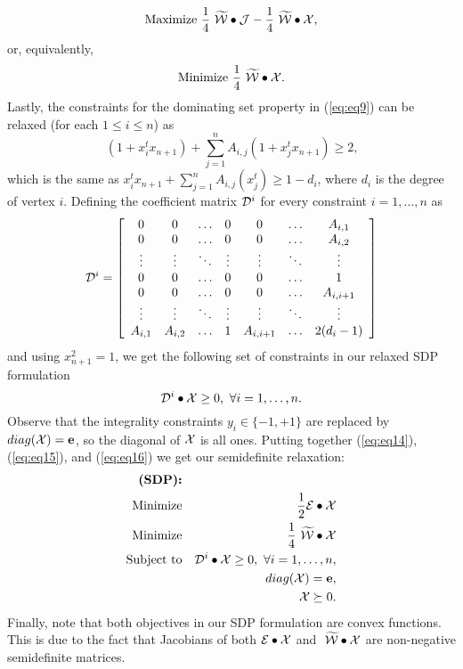 \documentclass{ieee}
\def\D{{\cal D}}
\def\E{{\cal E}}
\def\J{{\cal J}}
\def\W{{\cal W}}
\def\X{{\cal X}}
\def\e{{\bf e}}
\begin{document}
\[{\rm Maximize}\ \frac{1}{4}~\widetilde{\W} \bullet \J - \frac{1}{4}~\widetilde{\W} \bullet\X,\]
or, equivalently,
\begin{equation}
\label{eq:eq15}
{\rm Minimize }\ \frac{1}{4}~\widetilde{\W} \bullet\X.
\end{equation}
Lastly, the constraints for the dominating set property in (\ref{eq:eq9})
can be relaxed (for each $1\le i\le n$) as
\[ (1+x_i^tx_{n+1})+\sum_{j=1}^n A_{i,j}(1+x_j^tx_{n+1})\ge 2\mbox{,}\]
which is the same as
$x_i^tx_{n+1}+\sum_{j=1}^n A_{i,j}(x_j^t)\ge 1-d_i$,
where $d_i$ is the degree of vertex $i$. Defining the coefficient matrix 
$\D^i $ for every constraint $i=1,\ldots,n$ as
$$
\D^i= \left[
\begin{array}{ccccccc}
 0      &      0&  \ldots &  0   &  0       &\ldots &A_{i,1}   \\
 0      &      0&  \ldots &  0   &  0       &\ldots &A_{i,2}   \\
 \vdots & \vdots&  \ddots &\vdots&\vdots    &\ddots &\vdots   \\
 0      &      0&  \ldots &0     &0         &\ldots &1        \\
 0      &      0&  \ldots &0     &0         &\ldots &A_{i,i+1}\\
 \vdots & \vdots&  \ddots &\vdots&\vdots    &\ddots &\vdots   \\
 A_{i,1}& A_{i,2}&  \ldots &  1   &A_{i,i+1} &\ldots & 2(d_i-1) \\
\end{array}
\right]
$$
and using  $x_{n+1}^2=1$, we get the following set of
constraints in our relaxed SDP formulation
\begin{equation}
\label{eq:eq16}
\D^i \bullet \X \ge 0,\ \forall i=1, \ldots, n.
\end{equation}
Observe that the integrality constraints $y_i\in\{-1,+1\}$ are
replaced by $diag(\X)=\e$, so the diagonal of $\X$ is all ones.
Putting together (\ref{eq:eq14}), (\ref{eq:eq15}), and (\ref{eq:eq16})
we get our semidefinite relaxation:
\begin{eqnarray*}
{\textbf{(SDP):}}\\
{\rm Minimize }&& {\displaystyle \frac{1}{2}\E \bullet \X}                             \\
{\rm Minimize }&& {\displaystyle \frac{1}{4}~\widetilde{\W} \bullet\X}                \\
{\rm Subject\ to} && {\displaystyle \D^i \bullet \X \ge 0}, \  \forall i=1, \ldots, n,  \\
                    && {\displaystyle  diag(\X )=\e},          \\
                    && {\displaystyle  \X \succeq 0}.          
\end{eqnarray*}
Finally, note that both objectives in our SDP formulation are convex
functions. This is due to the fact that Jacobians of both $\E \bullet
\X$ and $~\widetilde{\W} \bullet\X$ are non-negative semidefinite
matrices.
\vspace{-0.1in}
\end{document}
